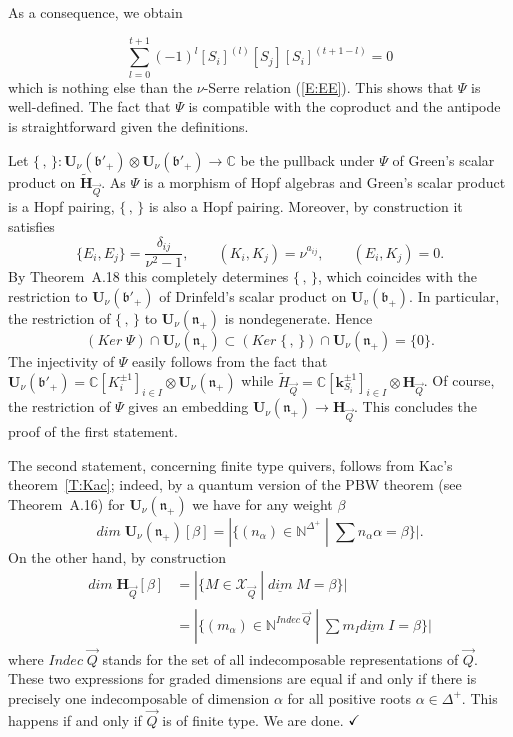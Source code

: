 \documentclass[a4paper,10pt]{amsart}
\def\H{\mathbf{H}}
\def\U{\mathbf{U}}
\def\qed{$\hfill \checkmark$}
\def\N{\mathbb{N}}
\def\a{\alpha}
\def\C{\mathbb{C}}
\def\bo{\mathfrak{b}}
\def\n{\mathfrak{n}}
\def\v{\nu}
\numberwithin{equation}{section}
\begin{document}
\vspace{.05in}

As a consequence, we obtain

$$\sum_{l=0}^{t+1} (-1)^l[S_i]^{(l)} [S_j] [S_i]^{(t+1-l)}=0$$
which is nothing else than the $\v$-Serre relation (\ref{E:EE}). This shows that $\Psi$ is well-defined. The fact that $\Psi$ is compatible with the coproduct and the antipode is straightforward given the definitions.

\vspace{.05in}

Let $\{\,,\,\}: \U_\nu(\bo'_+) \otimes \U_{\nu}(\bo'_+) \to \C$ be the pullback under $\Psi$ of Green's scalar product on $\widetilde{\H}_{\vec{Q}}$. As $\Psi$ is a morphism of Hopf algebras and Green's scalar product is a Hopf pairing, $\{\,,\,\}$ is also a Hopf pairing. Moreover, by construction it satisfies
$$ \{E_i,E_j\}=\frac{\delta_{ij}}{\v^2-1}, \qquad (K_i,K_j)=\v^{a_{ij}}, \qquad (E_i, K_j)=0.$$
By Theorem~A.18 this completely determines $\{\,,\,\}$, which  coincides with the restriction to $\U_\v(\bo'_+)$ of Drinfeld's scalar product on $\U_v(\bo_+)$. In particular, the restriction of $\{\,,\,\}$ to $\U_\v(\n_+)$ is nondegenerate. Hence
$$({Ker}\;\Psi) \cap \U_\v(\n_+) \subset ({Ker}\;\{\,,\,\}) \cap \U_\v(\n_+) =\{0\}.$$
The injectivity of $\Psi$ easily follows from the fact that $\U_\v(\bo'_+) = \C[K_i^{\pm 1}]_{i \in I} \otimes \U_\v(\n_+)$ while $\widetilde{H}_{\vec{Q}}=\C[\mathbf{k}^{\pm 1}_{S_i}]_{i \in I} \otimes \H_{\vec{Q}}$. Of course, the restriction of $\Psi$ gives an embedding $\U_\v(\n_+) \to \H_{\vec{Q}}$. This concludes the proof of the first statement.

The second statement, concerning finite type quivers, follows from Kac's theorem~\ref{T:Kac}; indeed, by a quantum version of the PBW theorem (see Theorem~A.16) for $\U_{\v}(\n_+)$ we have for any weight $\beta$
$$dim\;\U_{\v}(\n_+)[\beta]=|\{ (n_\a) \in \N^{\Delta^+}\;|\; \sum n_{\a} \a=\beta\}|.$$
On the other hand, by construction
\begin{equation*}
\begin{split}
dim\;\H_{\vec{Q}}[\beta]&=|\{M \in \mathcal{X}_{\vec{Q}}\;|\; \underline{dim}\;M=\beta\}|\\
&=|\{(m_\a) \in \N^{Indec\;\vec{Q}}\;|\; \sum m_I \underline{dim}\;I=\beta\}|
\end{split}
\end{equation*}
where $Indec\;\vec{Q}$ stands for the set of all indecomposable representations of $\vec{Q}$. These two expressions for graded dimensions are equal if and only if there is
precisely one indecomposable of dimension $\a$ for all positive roots $\a \in \Delta^+$. This happens if and only if $\vec{Q}$ is of finite type.
We are done. \qed
\end{document}
